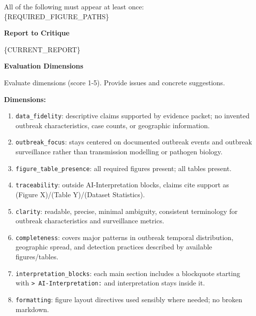 \begin{tcolorbox}
\begin{tcolorbox}[
    enhanced,
    colback=gray!5,
    colframe=gray!20,
    boxrule=0pt,
    leftrule=3pt,
    arc=0pt,
    left=6pt, right=6pt, top=4pt, bottom=4pt
]
\vspace{2pt}
{\small\ttfamily
All of the following must appear at least once:\\[6pt]
\{REQUIRED\_FIGURE\_PATHS\}
}
\end{tcolorbox}

\begin{tcolorbox}[
    enhanced,
    colback=gray!5,
    colframe=gray!20,
    boxrule=0pt,
    leftrule=3pt,
    arc=0pt,
    left=6pt, right=6pt, top=4pt, bottom=4pt
]
{\small\textbf{\textcolor{gray!70!black}{Report to Critique}}}

\vspace{2pt}
{\small\ttfamily
\{CURRENT\_REPORT\}
}
\end{tcolorbox}

\begin{tcolorbox}[
    enhanced,
    colback=gray!5,
    colframe=gray!20,
    boxrule=0pt,
    leftrule=3pt,
    arc=0pt,
    left=6pt, right=6pt, top=4pt, bottom=4pt
]
{\small\textbf{\textcolor{gray!60!black}{Evaluation Dimensions}}}

\vspace{2pt}
{\small
Evaluate dimensions (score 1-5). Provide issues and concrete suggestions.

\vspace{1em}

\textbf{Dimensions:}
\begin{enumerate}[label=\arabic*), leftmargin=*, itemsep=-3pt]
    \item \texttt{data\_fidelity}: descriptive claims supported by evidence packet; no invented outbreak characteristics, case counts, or geographic information.
    \item \texttt{outbreak\_focus}: stays centered on documented outbreak events and outbreak surveillance rather than transmission modelling or pathogen biology.
    \item \texttt{figure\_table\_presence}: all required figures present; all tables present.
    \item \texttt{traceability}: outside AI-Interpretation blocks, claims cite support as (Figure X)/(Table Y)/(Dataset Statistics).
    \item \texttt{clarity}: readable, precise, minimal ambiguity, consistent terminology for outbreak characteristics and surveillance metrics.
    \item \texttt{completeness}: covers major patterns in outbreak temporal distribution, geographic spread, and detection practices described by available figures/tables.
    \item \texttt{interpretation\_blocks}: each main section includes a blockquote starting with \texttt{> AI-Interpretation:} and interpretation stays inside it.
    \item \texttt{formatting}: figure layout directives used sensibly where needed; no broken markdown.
\end{enumerate}
}
\end{tcolorbox}


\end{tcolorbox}
